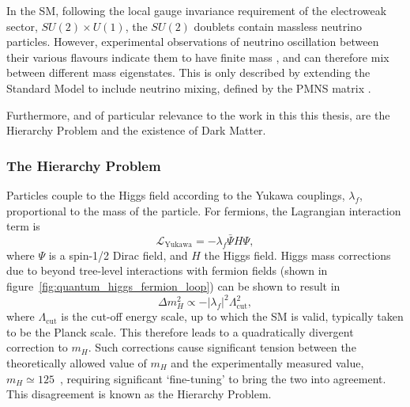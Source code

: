 In the SM, following the local gauge invariance requirement of the electroweak
sector, $SU(2)\times U(1)$, the $SU(2)$ doublets contain
massless neutrino particles. However, experimental observations of neutrino
oscillation between their various flavours indicate them to have finite mass
\cite{PhysRevLett.81.1562,PhysRevLett.89.011302}, and can
therefore mix between different mass eigenstates. This is only described
by extending the Standard Model to include neutrino mixing, defined by the
PMNS matrix \cite{Altarelli:2002hx}.

Furthermore, and of particular relevance to the work in this this thesis, are
the Hierarchy Problem and the existence of Dark Matter.

\subsubsection{The Hierarchy Problem}


Particles couple to the Higgs field according to the Yukawa couplings,
$\lambda_f$,
proportional to the mass of the particle. For fermions, the Lagrangian
interaction term is
% 
\begin{equation}
\mathcal{L}_\text{Yukawa} = - \lambda_f \bar{\Psi}H\Psi,
\end{equation}
% 
where $\Psi$ is a spin-1/2 Dirac field, and $H$ the Higgs field. Higgs mass
corrections due to beyond tree-level interactions with fermion
fields (shown in figure~\ref{fig:quantum_higgs_fermion_loop}) can be shown to
result in
% 
\begin{equation}
\Delta m_H^2 \propto -|\lambda_f|^2 \Lambda_{\text{cut}}^2,
\label{eq:higgs_corr_hierarchy}
\end{equation}
% 
where $\Lambda_{\text{cut}}$ is the cut-off energy scale, up to which the SM is
valid, typically taken to be the Planck scale. This therefore leads to a
quadratically
divergent correction to $m_H$. Such corrections cause significant tension
between the theoretically allowed value of $m_H$ and the experimentally
measured value, $m_H \simeq 125$~\gev \cite{PhysRevLett.114.191803},
requiring significant `fine-tuning' to bring the two into agreement. This
disagreement is known as the Hierarchy Problem.

